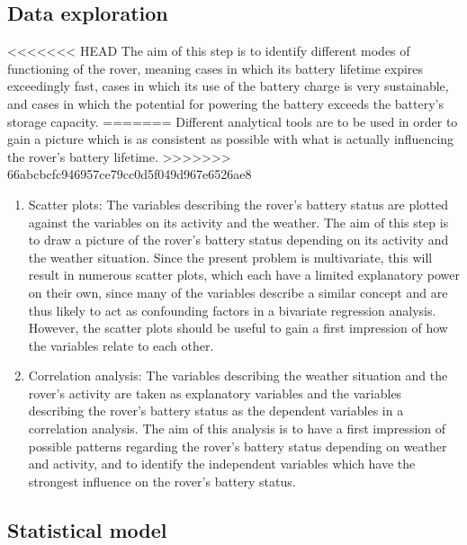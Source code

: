 \documentclass[11pt, UKenglish]{report}
\begin{document}
{\begin{enumerate}
\begin{enumerate}
\end{enumerate}

\subsection*{Data exploration}

<<<<<<< HEAD
The aim of this step is to identify different modes of functioning of the rover, meaning cases in which its battery lifetime expires exceedingly fast, cases in which its use of the battery charge is very sustainable, and cases in which the potential for powering the battery exceeds the battery's storage capacity. 
=======
Different analytical tools are to be used in order to gain a picture which is as consistent as possible with what is actually influencing the rover's battery lifetime.
>>>>>>> 66abcbcfc946957ce79cc0d5f049d967e6526ae8

\begin{enumerate}

	\item{\large{Scatter plots:} \normalsize The variables describing the rover's battery status are plotted against the variables on its activity and the weather. The aim of this step is to draw a picture of the rover's battery status depending on its activity and the weather situation. Since the present problem is multivariate, this will result in numerous scatter plots, which each have a limited explanatory power on their own, since many of the variables describe a similar concept and are thus likely to act as confounding factors in a bivariate regression analysis. However, the scatter plots should be useful to gain a first impression of how the variables relate to each other.}

	\item{\large{Correlation analysis:} \normalsize The variables describing the weather situation and the rover's activity are taken as explanatory variables and the variables describing the rover's battery status as the dependent variables in a correlation analysis. The aim of this analysis is to have a first impression of possible patterns regarding the rover's battery status depending on weather and activity, and to identify the independent variables which have the strongest influence on the rover's battery status.}

\end{enumerate}

\subsection*{Statistical model}


\end{enumerate}}
\end{document}
